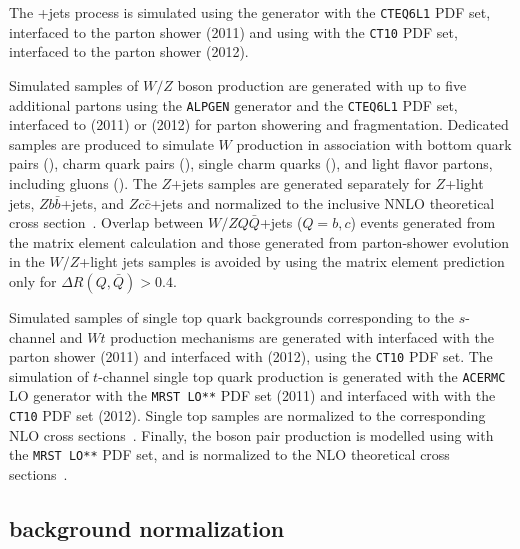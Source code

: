 The \ttbar{}+jets process is simulated using the \alpgen{} generator
with the {\tt CTEQ6L1} PDF set, interfaced to the 
\herwig{} parton shower (2011) and using \powheg{} with the {\tt CT10}
PDF set, interfaced to the \pythia{} parton shower
(2012).

Simulated samples of $W/Z$ boson production are generated with up to
five additional partons using the {\tt ALPGEN} generator and the
{\tt CTEQ6L1} PDF set, interfaced to \herwig{} (2011) or
\pythia{} (2012) for parton showering and fragmentation. 
Dedicated samples are produced to simulate $W$ production in
association with bottom quark pairs (\wbb{}), charm quark
pairs (\wcc{}), single charm quarks (\wc{}), and light
flavor partons, including gluons (\wlight{}).
The $Z$+jets samples are generated separately for $Z$+light jets,
$Zb\bar{b}$+jets, and $Zc\bar{c}$+jets and normalized to the inclusive
NNLO theoretical cross section~\cite{vjetsxs}.
Overlap between $W/ZQ\bar{Q}$+jets ($Q=b,c$) events generated from the
matrix element calculation and those generated from parton-shower
evolution in the $W/Z$+light jets samples is avoided by using the
matrix element prediction only for $\Delta R(Q,\bar{Q})>0.4$.

Simulated samples of single top quark backgrounds corresponding to the
$s$-channel and $Wt$ production mechanisms are generated with \mcatnlo{}
interfaced with the \herwig{} parton shower (2011) and \powheg{}
interfaced with \pythia{} (2012), using the {\tt CT10} PDF set.
The simulation of $t$-channel single top quark production is
generated with the {\tt ACERMC} LO generator with the {\tt MRST LO**}
PDF set (2011) and \powheg{} interfaced with \pythia{}
with the {\tt CT10} PDF set (2012). Single top samples are normalized
to the corresponding NLO cross sections~\cite{stschan,sttchan,stwt}.
Finally, the boson pair production is modelled using \herwig{} with
the {\tt MRST LO**} PDF set, and is normalized to the NLO
theoretical cross sections~\cite{dibosonxs}.

\subsection{\wjets{} background normalization}
\label{sec:wjets}

